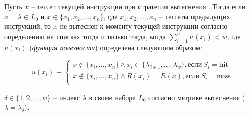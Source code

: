 \begin{lemma}\label{hit_I''} Пусть $x$ -- тегсет текущей
инструкции при стратегии вытеснения \LRU. Тогда если $x = \lambda
\in L_0$ и $x \in \{x_1, x_2, ..., x_n\}$, где $x_1, x_2, ..., x_n$
-- тегсеты предыдущих инструкций, то $x$ не вытеснен к моменту
текущей инструкции согласно определению \LRU на списках тогда и
только тогда, когда $\sum^n_{i=1} u(x_i) < w$, где $u(x_i)$
(\emph{функция полезности}) определена следующим образом:

$$u(x_i) \equiv \left\{
\begin{array}{l}
    x \notin \{x_i, ..., x_n\} \wedge x_i \in \{ \lambda_{\delta+1},
..., \lambda_w\}, \mbox{если}~S_i=\mbox{hit} \\
    x \notin \{x_i, ..., x_n\} \wedge R(x_i) = R(x), \mbox{если}~S_i=\mbox{miss}\\
\end{array}
\right.$$

$\delta \in \{1, 2, ..., w\}$ -- индекс $\lambda$ в своем наборе
$L_0$ согласно метрике вытеснения \LRU ($\lambda = \lambda_\delta$).


\end{lemma}
